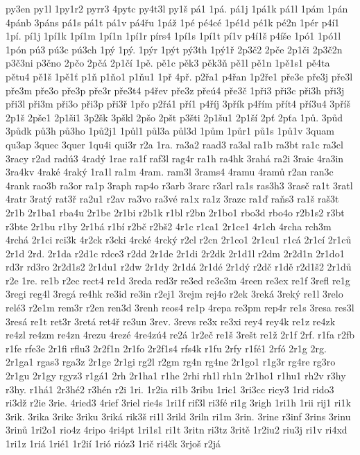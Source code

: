 {py3en
py1l
1py1r2
pyrr3
4pytc
py4t3l
py1š
pá1
1pá.
pá1j
1pá1k
pá1l
1pám
1pán
4pánb
3páns
pá1s
pá1t
pá1v
pá4řu
1páž
1pé
pé4cé
1pé1d
pé1k
pé2n
1pér
p4í1
1pí.
pí1j
1pí1k
1pí1m
1pí1n
1pí1r
pírs4
1pí1s
1pí1t
pí1v
p4í1š
p4íše
1pó1
1pó1l
1pón
pú3
pú3c
pú3ch
1pý
1pý.
1pýr
1pýt
pý3th
1pý1ř
2p3č2
2pče
2p1či
2p3č2n
p3č3ni
p3čno
2pčo
2pčá
2p1čí
1pě.
pě1c
pěk3
pěk3ň
pě1l
pě1n
1pě1s1
pě4ta
pětu4
pě1š
1pě1ť
p1ň
p1ňo1
p1ňu1
1př
4př.
p2řa1
p4řan
1p2ře1
pře3e
pře3j
pře3l
pře3m
pře3o
pře3p
pře3r
pře3t4
p4řev
pře3z
přeú4
pře3č
1při3
při3c
při3h
při3j
při3l
při3m
při3o
při3p
při3ř
1přo
p2řá1
pří1
p4říj
3přík
p4řím
přít4
pří3u4
3příš
2p1š
2pše1
2p1ši1
3p2šk
3pškl
2pšo
2pšt
p3šti
2p1šu1
2p1ší
2pť
2pťa
1pů.
3půd
3půdk
pů3h
pů3ho
1pů2j1
1půl1
půl3a
půl3d
1pům
1půr1
pů1s
1pů1v
3quam
qu3ap
3quec
3quer
1qu4i
qui3r
r2a
1ra.
ra3a2
raad3
ra3al
ra1b
ra3bt
ra1c
ra3cl
3racy
r2ad
radú3
4radý
1rae
ra1f
raf3l
rag4r
ra1h
ra4hk
3rahá
ra2i
3raic
4ra3in
3ra4kv
4raké
4raký
1ra1l
ra1m
4ram.
ram3l
3rams4
4ramu
4ramů
r2an
ran3c
4rank
rao3b
ra3or
ra1p
3raph
rap4o
r3arb
3rarc
r3arl
ra1s
ras3h3
3rasč
ra1t
3ratl
4ratr
3ratý
rat3ř
ra2u1
r2av
ra3vo
ra3vé
ra1x
ra1z
3razc
ra1ď
raňs3
ra1š
raš3t
2r1b
2r1ba1
rba4u
2r1be
2r1bi
r2b1k
r1bl
r2bn
2r1bo1
rbo3d
rbo4o
r2b1s2
r3bt
r3bte
2r1bu
r1by
2r1bá
r1bí
r2bč
r2bš2
4r1c
r1ca1
2r1ce1
4r1ch
4rcha
rch3m
4rchá
2r1ci
rci3k
4r2ck
r3cki
4rcké
4rcký
r2cl
r2cn
2r1co1
2r1cu1
r1cá
2r1cí
2r1ců
2r1d
2rd.
2r1da
r2d1c
rdce3
r2dd
2r1de
2r1di
2r2dk
2r1d1l
r2dm
2r2d1n
2r1do1
rd3r
rd3ro
2r2d1s2
2r1du1
r2dw
2r1dy
2r1dá
2r1dé
2r1dý
r2dč
r1dě
r2d1š2
2r1dů
r2e
1re.
re1b
r2ec
rect4
re1d
3reda
red3r
re3ed
re3e3m
4reen
re3ex
re1f
3refl
re1g
3regi
reg4l
3regá
re4hk
re3id
re3in
r2ej1
3rejm
rej4o
r2ek
3reká
3reký
re1l
3relo
relé3
r2e1m
rem3r
r2en
ren3d
3renh
reos4
re1p
4repa
re3pm
rep4r
re1s
3resa
res3l
3resá
re1t
ret3r
3retá
ret4ř
re3un
3rev.
3revs
re3x
re3xi
rey4
rey4k
re1z
re4zk
re4zl
re4zm
re4zn
4rezu
4rezé
4re4zú4
re2á
1r2eč
re1š
3rešt
re1ž
2r1f
2rf.
r1fa
r2fb
r1fe
rfe3e
2r1fi
rflu3
2r2f1n
2r1fo
2r2f1s4
rfs4k
r1fu
2rfy
r1fé1
2rfó
2r1g
2rg.
2r1ga1
rgas3
rga3z
2r1ge
2r1gi
rg2l
r2gm
rg4n
rg4ne
2r1go1
r1g3r
rg4re
rg3ro
2r1gu
2r1gy
rgyz3
r1gá1
2rh
2r1ha1
r1he
2rhi
rh1l
rh1n
2r1ho1
r1hu1
rh2v
r3hy
r3hy.
r1há1
2r3hé2
r3hén
r2i
1ri.
1r2ia
ri1b
3ribu
1ric1
3ri3cc
ricy3
1rid
rido3
ri3dž
r2ie
3rie.
4ried3
4rief
3riel
rie4s
1ri1f
rif3l
ri3fé
ri1g
3righ
1ri1h
1rii
rij1
ri1k
3rik.
3rika
3rikc
3riku
3riká
rik3š
ri1l
3rild
3riln
ri1m
3rin.
3rine
r3inf
3rins
3rinu
3rinů
1ri2o1
rio4z
4ripo
4ri4pt
1ri1s1
ri1t
3ritn
ri3tz
3ritě
1r2iu2
riu3j
ri1v
ri4xd
1ri1z
1riá
1rié1
1r2ií
1rió
rióz3
1rič
ri4čk
3rjoš
r2já
}

